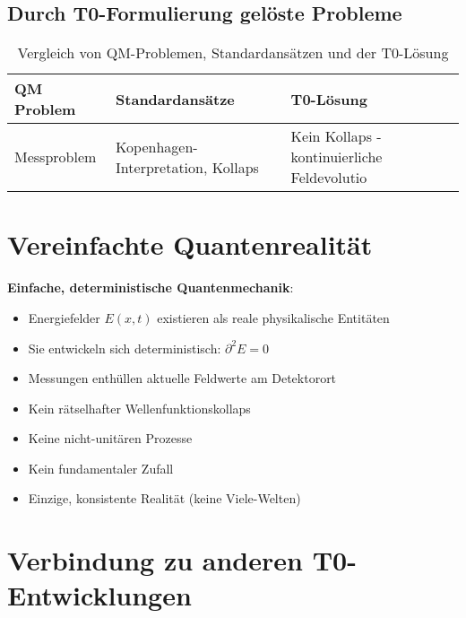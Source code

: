 \documentclass[12pt,a4paper]{article}
\newcommand{\Efield}{E}
\begin{document}
	\subsection{Durch T0-Formulierung gelöste Probleme}
	
\begin{table}[htbp]
	\centering
	\small
	\begin{tabular}{|p{4cm}|p{5cm}|p{6cm}|}
		\hline
		\textbf{QM Problem} & \textbf{Standardansätze} & \textbf{T0-Lösung} \\
		\hline
		Messproblem & Kopenhagen-Interpretation, Kollaps & Kein Kollaps - kontinuierliche Feldevolutio \\ %
		\hline %
	\end{tabular}
	\caption{Vergleich von QM-Problemen, Standardansätzen und der T0-Lösung} %
	\label{tab:qm_problem_comparison} %
\end{table}

\section{Vereinfachte Quantenrealität}

\begin{tcolorbox}[colback=green!5!white,colframe=green!75!black,title=T0 Quantenrealität]
	\textbf{Einfache, deterministische Quantenmechanik}:
	\begin{itemize}
		\item Energiefelder $\Efield(x,t)$ existieren als reale physikalische Entitäten
		\item Sie entwickeln sich deterministisch: $\partial^2 \Efield = 0$
		\item Messungen enthüllen aktuelle Feldwerte am Detektorort
		\item Kein rätselhafter Wellenfunktionskollaps
		\item Keine nicht-unitären Prozesse
		\item Kein fundamentaler Zufall
		\item Einzige, konsistente Realität (keine Viele-Welten)
	\end{itemize}
\end{tcolorbox}
			\section{Verbindung zu anderen T0-Entwicklungen}
			
\end{document}
